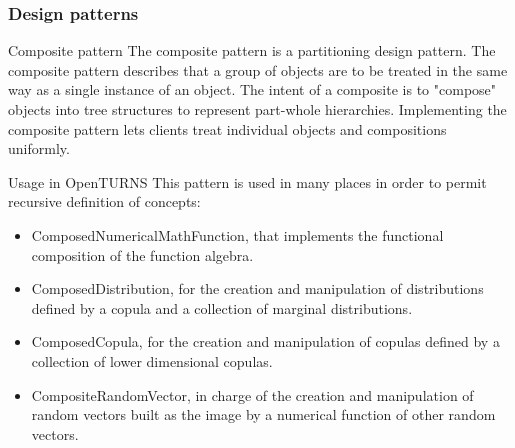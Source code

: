 \documentclass[8pt]{beamer}
\begin{document}
\begin{frame}
  \frametitle{Design patterns}
  \begin{block}{Composite pattern}
    The \alert{composite pattern} is a partitioning design pattern. The composite pattern describes that a group of objects are to be treated in the same way as a single instance of an object. The intent of a composite is to "compose" objects into tree structures to represent part-whole hierarchies. Implementing the composite pattern lets clients treat individual objects and compositions uniformly.
  \end{block}
  \begin{block}{Usage in OpenTURNS}
    This pattern is used in many places in order to permit recursive definition of concepts:
    \begin{itemize}
    \item \alert{ComposedNumericalMathFunction}, that implements the functional composition of the function algebra.
    \item \alert{ComposedDistribution}, for the creation and manipulation of distributions defined by a copula and a collection of marginal distributions.
    \item \alert{ComposedCopula}, for the creation and manipulation of copulas defined by a collection of lower dimensional copulas.
    \item \alert{CompositeRandomVector}, in charge of the creation and manipulation of random vectors built as the image by a numerical function of other random vectors.
    \end{itemize}
  \end{block}
\end{frame}
\end{document}
